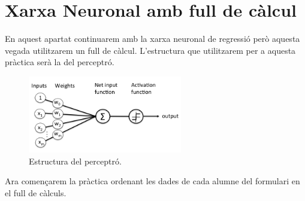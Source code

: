 %
%
%
%

\section{Xarxa Neuronal amb full de càlcul}\label{sec:11}
En aquest apartat continuarem amb la xarxa neuronal de regressió però aquesta vegada utilitzarem un full de càlcul.
L'estructura que utilitzarem per a aquesta pràctica serà la del perceptró.

\begin{figure}[h!]
    \centering
    \includegraphics[width=0.6\textwidth]{./figures/perceptro.png}
    \caption{Estructura del perceptró.~\cite{Img_perceptro}}
\end{figure}

Ara començarem la pràctica ordenant les dades de cada alumne del formulari en el full de càlculs.

